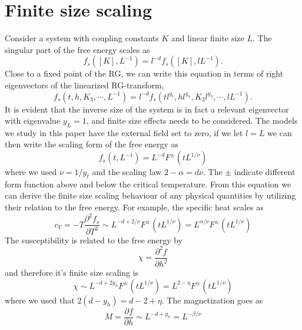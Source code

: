 \section{Finite size scaling}
Consider a system with coupling constants $K$ and linear finite size $L$. 
The singular part of the free energy scales as
\begin{equation}
  f_s([K],L^{-1}) = l^{-d}f_s([K],lL^{-1}).
  \label{}
\end{equation}
Close to a fixed point of the RG, we can write this equation in terms of right eigenvectors of the linearized RG-transform,
\begin{equation}
  f_s(t,h,K_3,\cdots,L^{-1}) = l^{-d}f_s(tl^{y_t},hl^{y_h},K_3 l^{y_3},\cdots,lL^{-1}).
  \label{}
\end{equation}
It is evident that the inverse size of the system is in fact a relevant eigenvector with eigenvalue $y_L = 1$, and finite size effects needs to be considered. 
The models we study in this paper have the external field set to zero, if we let $l = L$ we can then write the scaling form of the free energy as
\begin{equation}
  f_s(t,L^{-1}) = L^{-d} F^{\pm}(t L^{1/\nu})
  \label{}
\end{equation}
where we used $\nu = 1/y_t$ and the scaling law $2 -\alpha = d\nu$.
The $\pm$ indicate different form function above and below the critical temperature.
From this equation we can derive the finite size scaling behaviour of any physical quantities by utilizing their relation to the free energy. For example, the specific heat scales as
\begin{equation}
  c_V = -T\frac{\partial ^2 f_s}{\partial T^2} \sim L^{-d +2/\nu}F^{\pm}(tL^{1/\nu}) = L^{\alpha/\nu} F^{\pm}(tL^{1/\nu})
  \label{<++>}
\end{equation}
The susceptibility is related to the free energy by 
\begin{equation}
  \chi = \frac{\partial^2 f}{\partial h^2}
  \label{<++>}
\end{equation}
and therefore it's finite size scaling is 
\begin{equation}
  \chi \sim L^{-d +2y_h}F^{\pm}(tL^{1/\nu}) = L^{2-\eta}F^{\pm}(tL^{1/\nu})
  \label{}
\end{equation}
where we used that $ 2(d-y_h) = d -2 +\eta$.
The magnetization goes as
\begin{equation}
  M = \frac{\partial f}{\partial h} \sim L^{-d + y_h} = L^{-\beta/\nu}
  \label{<++>}
\end{equation}
